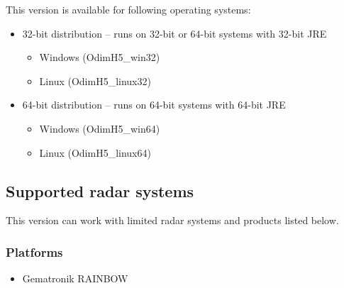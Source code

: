 \documentclass[11p]{article}
\begin{document}
This version is available for following operating systems:
\begin{itemize}

  \item 32-bit distribution -- runs on 32-bit or 64-bit systems with 32-bit JRE
  \begin{itemize}
      \item Windows (OdimH5\_win32)
      \item Linux (OdimH5\_linux32)
      
	\end{itemize}
	\item 64-bit distribution -- runs on 64-bit systems with 64-bit JRE

      \begin{itemize}
      \item Windows (OdimH5\_win64)
      \item Linux (OdimH5\_linux64)
      
	\end{itemize}
   
\end{itemize}

\subsection{Supported radar systems}

This version can work with limited radar systems and products listed below.

\subsubsection*{Platforms}
\begin{itemize}
  \item Gematronik RAINBOW
\end{itemize}
\end{document}
